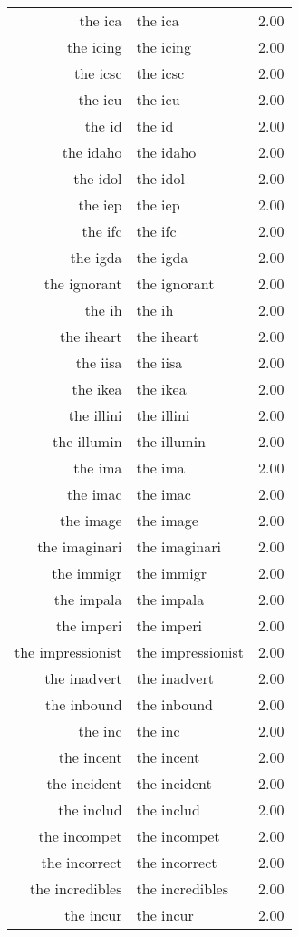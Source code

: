 \begin{table}[ht]
\begin{tabular}{rlr}
  the ica & the ica & 2.00 \\ 
  the icing & the icing & 2.00 \\ 
  the icsc & the icsc & 2.00 \\ 
  the icu & the icu & 2.00 \\ 
  the id & the id & 2.00 \\ 
  the idaho & the idaho & 2.00 \\ 
  the idol & the idol & 2.00 \\ 
  the iep & the iep & 2.00 \\ 
  the ifc & the ifc & 2.00 \\ 
  the igda & the igda & 2.00 \\ 
  the ignorant & the ignorant & 2.00 \\ 
  the ih & the ih & 2.00 \\ 
  the iheart & the iheart & 2.00 \\ 
  the iisa & the iisa & 2.00 \\ 
  the ikea & the ikea & 2.00 \\ 
  the illini & the illini & 2.00 \\ 
  the illumin & the illumin & 2.00 \\ 
  the ima & the ima & 2.00 \\ 
  the imac & the imac & 2.00 \\ 
  the image & the image & 2.00 \\ 
  the imaginari & the imaginari & 2.00 \\ 
  the immigr & the immigr & 2.00 \\ 
  the impala & the impala & 2.00 \\ 
  the imperi & the imperi & 2.00 \\ 
  the impressionist & the impressionist & 2.00 \\ 
  the inadvert & the inadvert & 2.00 \\ 
  the inbound & the inbound & 2.00 \\ 
  the inc & the inc & 2.00 \\ 
  the incent & the incent & 2.00 \\ 
  the incident & the incident & 2.00 \\ 
  the includ & the includ & 2.00 \\ 
  the incompet & the incompet & 2.00 \\ 
  the incorrect & the incorrect & 2.00 \\ 
  the incredibles & the incredibles & 2.00 \\ 
  the incur & the incur & 2.00 \\ 

\end{tabular}
\end{table}
